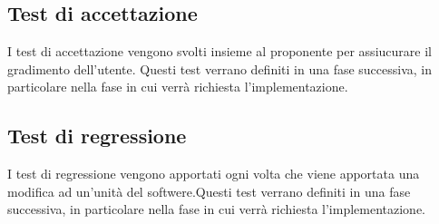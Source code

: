 \subsection{Test di accettazione}
    I test di accettazione vengono svolti insieme al proponente per assiucurare il gradimento dell'utente. Questi test verrano definiti in una fase successiva, in particolare nella fase in cui verrà richiesta l'implementazione.
    
\subsection{Test di regressione}
    I test di regressione vengono apportati ogni volta che viene apportata una modifica ad un'unità del softwere.Questi test verrano definiti in una fase successiva, in particolare nella fase in cui verrà richiesta l'implementazione.